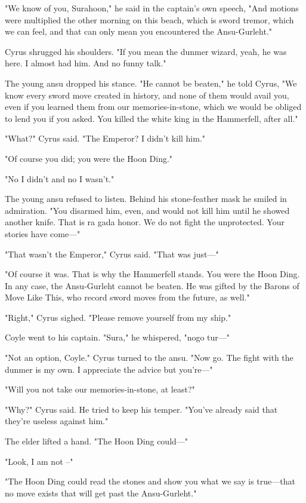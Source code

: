 "We know of you, Surahoon," he said in the captain’s own speech, "And motions were multiplied the other morning on this beach, which is sword tremor, which we can feel, and that can only mean you encountered the Ansu-Gurleht."

Cyrus shrugged his shoulders. "If you mean the dunmer wizard, yeah, he was here. I almost had him. And no funny talk."

The young ansu dropped his stance. "He cannot be beaten," he told Cyrus, "We know every sword move created in history, and none of them would avail you, even if you learned them from our memories-in-stone, which we would be obliged to lend you if you asked. You killed the white king in the Hammerfell, after all."

"What?" Cyrus said. "The Emperor? I didn’t kill him."

"Of course you did; you were the Hoon Ding."

"No I didn’t and no I wasn’t."

The young ansu refused to listen. Behind his stone-feather mask he smiled in admiration. "You disarmed him, even, and would not kill him until he showed another knife. That is ra gada honor. We do not fight the unprotected. Your stories have come—"

"That wasn’t the Emperor," Cyrus said. "That was just—"

"Of course it was. That is why the Hammerfell stands. You were the Hoon Ding. In any case, the Ansu-Gurleht cannot be beaten. He was gifted by the Barons of Move Like This, who record sword moves from the future, as well."

"Right," Cyrus sighed. "Please remove yourself from my ship."

Coyle went to his captain. "Sura," he whispered, "nogo tur—"

"Not an option, Coyle." Cyrus turned to the ansu. "Now go. The fight with the dunmer is my own. I appreciate the advice but you’re—"

"Will you not take our memories-in-stone, at least?"

"Why?" Cyrus said. He tried to keep his temper. "You’ve already said that they’re useless against him."

The elder lifted a hand. "The Hoon Ding could—"

"Look, I am not –"

"The Hoon Ding could read the stones and show you what we say is true—that no move exists that will get past the Ansu-Gurleht."

